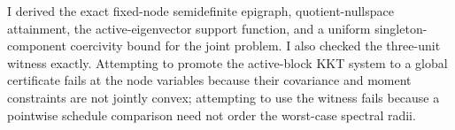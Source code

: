 I derived the exact fixed-node semidefinite epigraph, quotient-nullspace attainment, the active-eigenvector support function, and a uniform singleton-component coercivity bound for the joint problem.  I also checked the three-unit witness exactly.  Attempting to promote the active-block KKT system to a global certificate fails at the node variables because their covariance and moment constraints are not jointly convex; attempting to use the witness fails because a pointwise schedule comparison need not order the worst-case spectral radii.